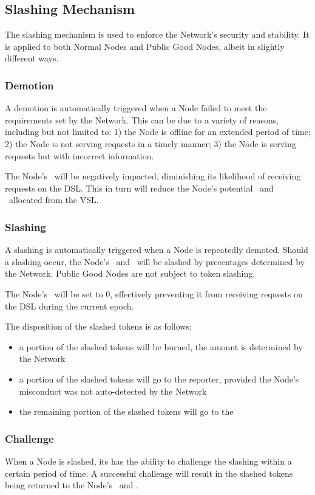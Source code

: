 \subsection{Slashing Mechanism}

The slashing mechanism is used to enforce the Network's security and stability.
It is applied to both Normal Nodes and Public Good Nodes, albeit in slightly different ways.

\subsubsection{Demotion}
A demotion is automatically triggered when a Node failed to meet the requirements set by the Network.
This can be due to a variety of reasons, including but not limited to: 1) the Node is offline for an extended period of time; 2) the Node is not serving requests in a timely manner; 3) the Node is serving requests but with incorrect information.

The Node's \reliabilityScore\ will be negatively impacted, diminishing its likelihood of receiving requests on the \gls{DSL}.
This in turn will reduce the Node's potential \operationReward\ and \stakingReward\ allocated from the \gls{VSL}.


\subsubsection{Slashing}

A slashing is automatically triggered when a Node is repeatedly demoted.
Should a slashing occur, the Node's \operationPool\ and \stakingPool\ will be slashed by precentages determined by the Network. Public Good Nodes are not subject to token slashing.

The Node's \reliabilityScore\ will be set to 0, effectively preventing it from receiving requests on the \gls{DSL} during the current epoch.

The disposition of the slashed tokens is as follows:
\begin{itemize}
    \item a portion of the slashed tokens will be burned, the amount is determined by the Network
    \item a portion of the slashed tokens will go to the reporter, provided the Node’s misconduct was not auto-detected by the Network
    \item the remaining portion of the slashed tokens will go to the \publicGoodPool
\end{itemize}

\subsubsection{Challenge}
When a Node is slashed, its  has the ability to challenge the slashing within a certain period of time. A successful challenge will result in the slashed tokens being returned to the Node's \operationPool\ and \stakingPool.